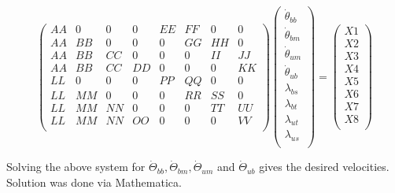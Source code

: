\documentclass[10pt]{article} %
\begin{document}
\[
\begin{pmatrix}
  AA & 0 & 0 & 0 & EE & FF & 0 & 0\\
  AA & BB & 0 & 0 & 0 & GG & HH & 0\\
  AA & BB & CC & 0 & 0 & 0 & II & JJ\\
  AA & BB & CC & DD & 0 & 0 & 0 & KK\\
  LL & 0 & 0 & 0 & PP & QQ & 0 & 0\\
  LL & MM & 0 & 0 & 0 & RR & SS & 0\\
  LL & MM & NN & 0 & 0 & 0 & TT & UU\\
  LL & MM & NN & OO & 0 & 0 & 0 & VV\\
\end{pmatrix}
\begin{pmatrix}
    \dot{\theta}_{bb}\\
    \dot{\theta}_{bm}\\
    \dot{\theta}_{um}\\
    \dot{\theta}_{ub}\\
    \lambda_{bs}\\
    \lambda_{bt}\\
    \lambda_{ut}\\
    \lambda_{us}\\
  \end{pmatrix}
=
\begin{pmatrix}
  X1\\
  X2\\
  X3\\
  X4\\
  X5\\
  X6\\
  X7\\
  X8\\
\end{pmatrix}
\]

Solving the above system for $\dot{\Theta}_{bb}, \dot{\Theta}_{bm}, \dot{\Theta}_{um}$ and $\dot{\Theta}_{ub}$ gives the desired velocities. Solution was done via Mathematica.
\end{document}
